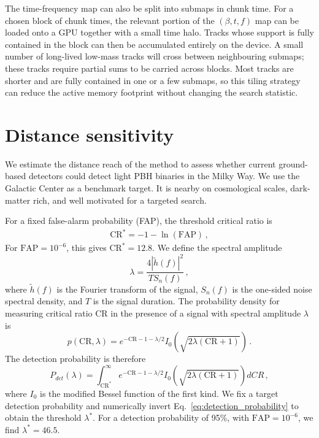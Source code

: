 \documentclass[aps,prd,amsmath,floats,floatfix, twocolumn,
superscriptaddress,nofootinbib,showpacs]{revtex4-2}
\newcommand{\CR}{\text{CR}}
\begin{document}
The time-frequency map can also be split into submaps in chunk time.  For a
chosen block of chunk times, the relevant portion of the $(\beta,t,f)$ map can
be loaded onto a GPU together with a small time halo.  Tracks whose support is
fully contained in the block can then be accumulated entirely on the device.  A
small number of long-lived low-mass tracks will cross between neighbouring
submaps; these tracks require partial sums to be carried across blocks.  Most
tracks are shorter and are fully contained in one or a few submaps, so this
tiling strategy can reduce the active memory footprint without changing the
search statistic.

\section{Distance sensitivity}
\label{sec:distance_sensitivity}
We estimate the distance reach of the method to assess whether current ground-based detectors could detect light PBH binaries in the Milky Way.  We use the Galactic Center as a benchmark target.  It is nearby on cosmological scales, dark-matter rich, and well motivated for a targeted search.

For a fixed false-alarm probability (FAP), the threshold critical ratio is
\begin{gather}
\CR^* = -1 - \ln(\text{FAP}) \, , \label{eq:CR_thresh}
\end{gather}
For $\text{FAP}=10^{-6}$, this gives $\CR^*=12.8$.  We define the spectral amplitude
\begin{equation}
    \lambda = \frac{4|\tilde{h}(f)|^2}{T S_n(f)} \, , \label{eq:spectral_amplitude} 
\end{equation}
where $\tilde{h}(f)$ is the Fourier transform of the signal, $S_n(f)$ is the one-sided noise spectral density, and $T$ is the signal duration.  The probability density for measuring critical ratio $\CR$ in the presence of a signal with spectral amplitude $\lambda$ is
\begin{equation}
    p(\CR, \lambda) = e^{-\CR-1-\lambda/2}I_0(\sqrt{2\lambda (\CR+1)}) \, .
    \label{eq:CR_pdf}
\end{equation}
The detection probability is therefore
\begin{equation}
    P_{det}(\lambda) = \int_{\CR^*}^\infty e^{-\CR-1-\lambda/2}I_0(\sqrt{2\lambda (\CR+1)}) dCR \, , \label{eq:detection_probability}
\end{equation}
where $I_0$ is the modified Bessel function of the first kind.  We fix a target detection probability and numerically invert Eq.~\eqref{eq:detection_probability} to obtain the threshold $\lambda^*$.  For a detection probability of 95\%, with $\text{FAP}=10^{-6}$, we find $\lambda^*=46.5$.
\end{document}
